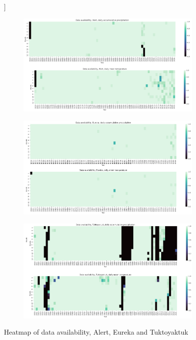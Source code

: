 \documentclass[draft]{agujournal2019}
\begin{document}
\begin{figure}[h!tbp]]
\centering
\begin{subfigure}[b]{0.55\textwidth}
   \includegraphics[width=1\linewidth]{figures/heatmaps_alert.png}
   \caption{}
   \label{fig:Ng1} 
\end{subfigure}

\begin{subfigure}[b]{0.55\textwidth}
   \includegraphics[width=1\linewidth]{figures/heatmaps_eureka.png}
   \caption{}
   \label{fig:Ng2}
\end{subfigure}

\begin{subfigure}[b]{0.55\textwidth}
   \includegraphics[width=1\linewidth]{figures/heatmaps_tuktoyaktuk.png}
   \caption{}
   \label{fig:Ng3} 
\end{subfigure}

\caption{Heatmap of data availability, Alert, Eureka and Tuktoyaktuk}
\end{figure}
\end{document}

